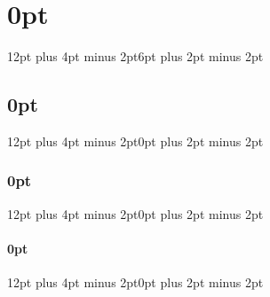 
\usepackage{csquotes}

\usepackage{setspace}
\linespread{1.5}                         %
\usepackage{microtype}                   %
\usepackage{parskip}                     %

\usepackage{booktabs}
\usepackage{tabularx}
\usepackage{array}
\usepackage[flushleft]{threeparttable}

\usepackage{graphicx}
\usepackage{float}
\usepackage{subcaption}

\usepackage{xcolor}
\usepackage{soul}

\usepackage[ruled, vlined, linesnumbered]{algorithm2e}

\usepackage{tikz}
\usepackage{tikz-cd}
\usetikzlibrary{shapes, arrows, positioning, decorations.pathreplacing}
\usepackage{pgfplots}
\pgfplotsset{compat=1.15}

\usepackage{titlesec}
\titlespacing\chapter{0pt}{12pt plus 4pt minus 2pt}{6pt plus 2pt minus 2pt}
\titlespacing\section{0pt}{12pt plus 4pt minus 2pt}{0pt plus 2pt minus 2pt}
\titlespacing\subsection{0pt}{12pt plus 4pt minus 2pt}{0pt plus 2pt minus 2pt}
\titlespacing\subsubsection{0pt}{12pt plus 4pt minus 2pt}{0pt plus 2pt minus 2pt}

\usepackage{enumitem}

\usepackage[
  backend=biber,
  authordate,
  dashed=false,
  doi=false,
  url=false,
  maxbibnames=9,
  isbn=false
]{biblatex-chicago}


